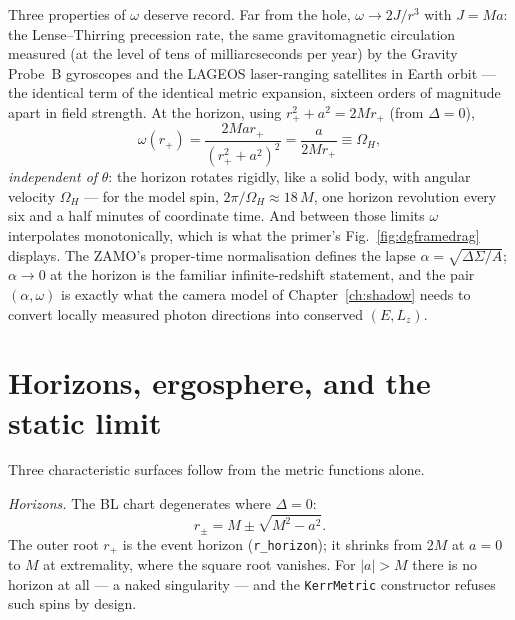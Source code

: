Three properties of $\omega$ deserve record. Far from the hole,
$\omega \to 2J/r^3$ with $J = Ma$: the Lense--Thirring precession rate,
the same gravitomagnetic circulation measured (at the level of tens of
milliarcseconds per year) by the Gravity Probe~B gyroscopes and the
LAGEOS laser-ranging satellites in Earth orbit — the identical term of
the identical metric expansion, sixteen orders of magnitude apart in
field strength. At the horizon, using $r_+^2 + a^2 = 2Mr_+$ (from
$\Delta = 0$),
\begin{equation}
\omega(r_+) = \frac{2Mar_+}{(r_+^2+a^2)^2} = \frac{a}{2Mr_+}
\equiv \Omega_H,
\label{eq:omegah}
\end{equation}
\emph{independent of} $\theta$: the horizon rotates rigidly, like a
solid body, with angular velocity $\Omega_H$ — for the \sgra{} model
spin, $2\pi/\Omega_H \approx 18\,M$, one horizon revolution every six
and a half minutes of coordinate time. And between those limits $\omega$ interpolates
monotonically, which is what the primer's Fig.~\ref{fig:dgframedrag}
displays. The ZAMO's proper-time normalisation defines the lapse
$\alpha = \sqrt{\Delta\Sigma/A}$; $\alpha \to 0$ at the horizon is the
familiar infinite-redshift statement, and the pair $(\alpha, \omega)$
is exactly what the camera model of Chapter~\ref{ch:shadow} needs to
convert locally measured photon directions into conserved $(E, L_z)$.

\section{Horizons, ergosphere, and the static limit}
\label{sec:radii}

Three characteristic surfaces follow from the metric functions alone.

\emph{Horizons.} The BL chart degenerates where $\Delta = 0$:
\begin{equation}
r_\pm = M \pm \sqrt{M^2 - a^2}.
\label{eq:horizon}
\end{equation}
The outer root $r_+$ is the event horizon (\texttt{r\_horizon}); it
shrinks from $2M$ at $a = 0$ to $M$ at extremality, where the square root
vanishes. For $|a| > M$ there is no horizon at all — a naked
singularity — and the \texttt{KerrMetric} constructor refuses such spins
by design.

